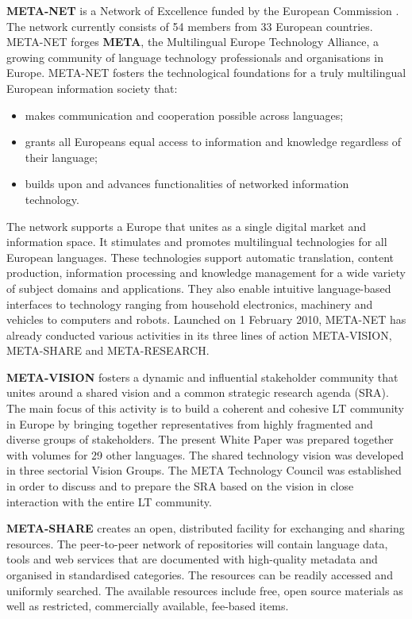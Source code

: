 \begin{multicols}{2}

\textbf{META-NET} is a Network of Excellence funded by the European Commission \cite{rehm2011}. The network currently consists of 54 members from 33 European countries. 
META-NET forges \textbf{META}, the Multilingual Europe Technology Alliance, a growing community of language technology professionals and organisations in Europe.
META-NET fosters the technological foundations for a truly multilingual European information society that:

\begin{itemize}
\item makes communication and cooperation possible across languages;
\item grants all Europeans equal access to information and knowledge regardless of their language;
\item builds upon and advances functionalities of networked information technology.
\end{itemize}

The network supports a Europe that unites as a single digital market and information space. It stimulates and promotes multilingual technologies for all European languages. These technologies support automatic translation, content production, information processing and knowledge management for a wide variety of subject domains and applications. They also enable intuitive language-based interfaces to technology ranging from household electronics, machinery and vehicles to computers and robots.
Launched on 1 February 2010, META-NET has already conducted various activities in its three lines of action META-VISION, META-SHARE and META-RESEARCH. 

\textbf{META-VISION} fosters a dynamic and influential stakeholder community that unites around a shared vision and a common strategic research agenda (SRA). The main focus of this activity is to build a coherent and cohesive LT community in Europe by bringing together representatives from highly fragmented and diverse groups of stakeholders. The present White Paper was prepared together with volumes for 29 other languages. The shared technology vision was developed in three sectorial Vision Groups. The META Technology Council was established in order to discuss and to prepare the SRA based on the vision in close interaction with the entire LT community.

\textbf{META-SHARE} creates an open, distributed facility for exchanging and sharing resources. The peer-to-peer network of repositories will contain language data, tools and web services that are documented with high-quality metadata and organised in standardised categories. The resources can be readily accessed and uniformly searched. The available resources include free, open source materials as well as restricted, commercially available, fee-based items. 


\end{multicols}
